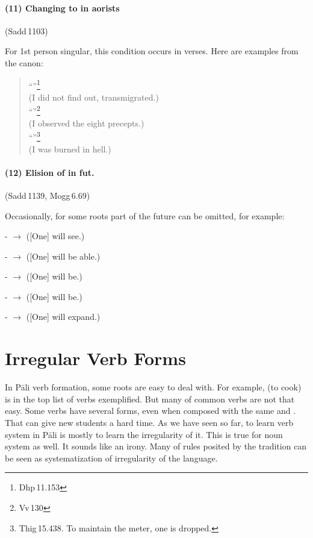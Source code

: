 \paragraph*{(11) Changing  to  in aorists} (Sadd\,1103)\par
For 1st person singular, this condition occurs in verses. Here are examples from the canon:\par
\begin{quote}
``''\footnote{Dhp\,11.153}\\
(I did not find out, transmigrated.)\\[1.5mm]
``''\footnote{Vv\,130}\\
(I observed the eight precepts.)\\[1.5mm]
``''\footnote{Thig\,15.438. To maintain the meter, one  is dropped.}\\
(I was burned in hell.)
\end{quote}

\paragraph*{(12) Elision of  in fut.} (Sadd\,1139, Mogg\,6.69)\par
Occasionally, for some roots  part of the future  can be omitted, for example:\par
-  $\rightarrow$  ([One] will see.)\par
-  $\rightarrow$  ([One] will be able.)\par
-  $\rightarrow$  ([One] will be.)\par
-  $\rightarrow$  ([One] will be.)\par
-  $\rightarrow$  ([One] will expand.)\par

\section{Irregular Verb Forms}\label{sec:irrverb}

In P\=ali verb formation, some roots are easy to deal with. For example,  (to cook) is in the top list of verbs exemplified. But many of common verbs are not that easy. Some verbs have several forms, even when composed with the same  and . That can give new students a hard time. As we have seen so far, to learn verb system in P\=ali is mostly to learn the irregularity of it. This is true for noun system as well. It sounds like an irony. Many of rules posited by the tradition can be seen as systematization of irregularity of the language. 

